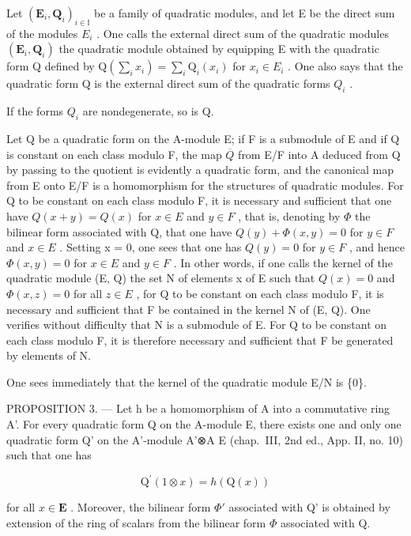 Let \((\mathbf{E}_{i}, \mathbf{Q}_{i})_{i\in\mathbb{I}}\) be a family of quadratic modules, and let E be the direct sum of the modules \(E_{i}\) . One calls the external direct sum of the quadratic modules \((\mathbf{E}_{i}, \mathbf{Q}_{i})\) the quadratic module obtained by equipping E with the quadratic form Q defined by \(\mathrm{Q}(\sum_{i}x_{i}) = \sum_{i}\mathrm{Q}_{i}(x_{i})\) for \(x_{i} \in E_{i}\) . One also says that the quadratic form Q is the external direct sum of the quadratic forms \(Q_{i}\) .

If the forms \(Q_{i}\) are nondegenerate, so is Q.

Let Q be a quadratic form on the A-module E; if F is a submodule of E and if Q is constant on each class modulo F, the map \(\overline{Q}\) from E/F into A deduced from Q by passing to the quotient is evidently a quadratic form, and the canonical map from E onto E/F is a homomorphism for the structures of quadratic modules. For Q to be constant on each class modulo F, it is necessary and sufficient that one have \(Q(x + y) = Q(x)\) for \(x \in E\) and \(y \in F\) , that is, denoting by \(\Phi\) the bilinear form associated with Q, that one have \(Q(y) + \Phi(x, y) = 0\) for \(y \in F\) and \(x \in E\) . Setting x = 0, one sees that one has \(Q(y) = 0\) for \(y \in F\) , and hence \(\Phi(x,y)=0\) for \(x\in E\) and \(y\in F\) . In other words, if one calls the kernel of the quadratic module (E, Q) the set N of elements x of E such that \(Q(x)=0\) and \(\Phi(x,z)=0\) for all \(z\in E\) , for Q to be constant on each class modulo F, it is necessary and sufficient that F be contained in the kernel N of (E, Q). One verifies without difficulty that N is a submodule of E. For Q to be constant on each class modulo F, it is therefore necessary and sufficient that F be generated by elements of N.

One sees immediately that the kernel of the quadratic module E/N is \{0\}.

PROPOSITION 3. --- Let h be a homomorphism of A into a commutative ring A'. For every quadratic form Q on the A-module E, there exists one and only one quadratic form Q' on the A'-module A'⊗A E (chap.~III, 2nd ed., App. II, no. 10) such that one has

\[
\mathrm{Q} ^ {\prime} (1 \otimes x) = h (\mathrm{Q} (x))\tag{17}
\]

for all \(x \in \mathbf{E}\) . Moreover, the bilinear form \(\Phi'\) associated with Q' is obtained by extension of the ring of scalars from the bilinear form \(\Phi\) associated with Q.


